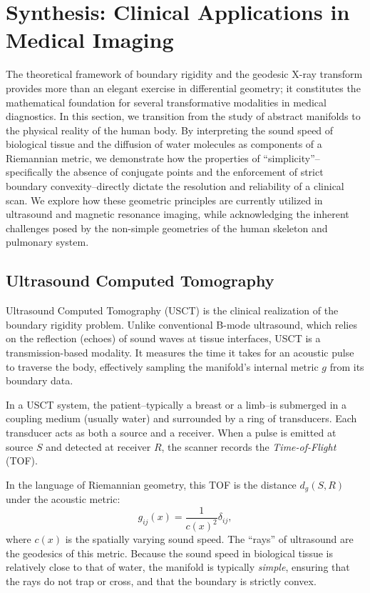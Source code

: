 \section{Synthesis: Clinical Applications in Medical Imaging}
\label{sec:synthesis_clinical_applications_in_medical_imaging}

The theoretical framework of boundary rigidity and the geodesic X-ray transform provides more than an elegant exercise in differential geometry; it constitutes the mathematical foundation for several transformative modalities in medical diagnostics. In this section, we transition from the study of abstract manifolds to the physical reality of the human body. By interpreting the sound speed of biological tissue and the diffusion of water molecules as components of a Riemannian metric, we demonstrate how the properties of ``simplicity''--specifically the absence of conjugate points and the enforcement of strict boundary convexity--directly dictate the resolution and reliability of a clinical scan. We explore how these geometric principles are currently utilized in ultrasound and magnetic resonance imaging, while acknowledging the inherent challenges posed by the non-simple geometries of the human skeleton and pulmonary system.

\subsection{Ultrasound Computed Tomography} Ultrasound Computed Tomography (USCT) is the clinical realization of the boundary rigidity problem. Unlike conventional B-mode ultrasound, which relies on the reflection (echoes) of sound waves at tissue interfaces, USCT is a transmission-based modality. It measures the time it takes for an acoustic pulse to traverse the body, effectively sampling the manifold's internal metric $g$ from its boundary data.

In a USCT system, the patient--typically a breast or a limb--is submerged in a coupling medium (usually water) and surrounded by a ring of transducers. Each transducer acts as both a source and a receiver. When a pulse is emitted at source $S$ and detected at receiver $R$, the scanner records the \emph{Time-of-Flight} (TOF).

In the language of Riemannian geometry, this TOF is the distance $d_g(S, R)$ under the acoustic metric:
\[%
  g_{ij}(x) = \frac{1}{c(x)^2} \delta_{ij}
,\]%
where $c(x)$ is the spatially varying sound speed. The ``rays'' of ultrasound are the geodesics of this metric. Because the sound speed in biological tissue is relatively close to that of water, the manifold is typically \emph{simple}, ensuring that the rays do not trap or cross, and that the boundary is strictly convex.

